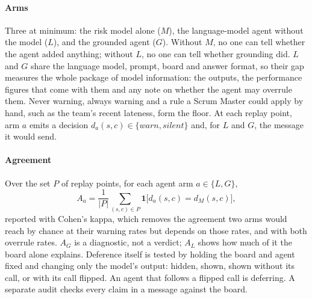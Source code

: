 \documentclass[conference]{IEEEtran}
\begin{document}
\paragraph{Arms} Three at minimum: the risk model alone ($M$), the language-model agent without the model ($L$), and the grounded agent ($G$). Without $M$, no one can tell whether the agent added anything; without $L$, no one can tell whether grounding did. $L$ and $G$ share the language model, prompt, board and answer format, so their gap measures the whole package of model information: the outputs, the performance figures that come with them and any note on whether the agent may overrule them. Never warning, always warning and a rule a Scrum Master could apply by hand, such as the team's recent lateness, form the floor. At each replay point, arm $a$ emits a decision $d_a(s,c) \in \{\textit{warn}, \textit{silent}\}$ and, for $L$ and $G$, the message it would send.

\paragraph{Agreement} Over the set $P$ of replay points, for each agent arm $a \in \{L, G\}$,
\[
A_a = \frac{1}{|P|} \sum_{(s,c) \in P} \mathbf{1}\big[d_a(s,c) = d_M(s,c)\big],
\]
reported with Cohen's kappa, which removes the agreement two arms would reach by chance at their warning rates but depends on those rates, and with both overrule rates. $A_G$ is a diagnostic, not a verdict; $A_L$ shows how much of it the board alone explains. Deference itself is tested by holding the board and agent fixed and changing only the model's output: hidden, shown, shown without its call, or with its call flipped. An agent that follows a flipped call is deferring. A separate audit checks every claim in a message against the board.
\end{document}
